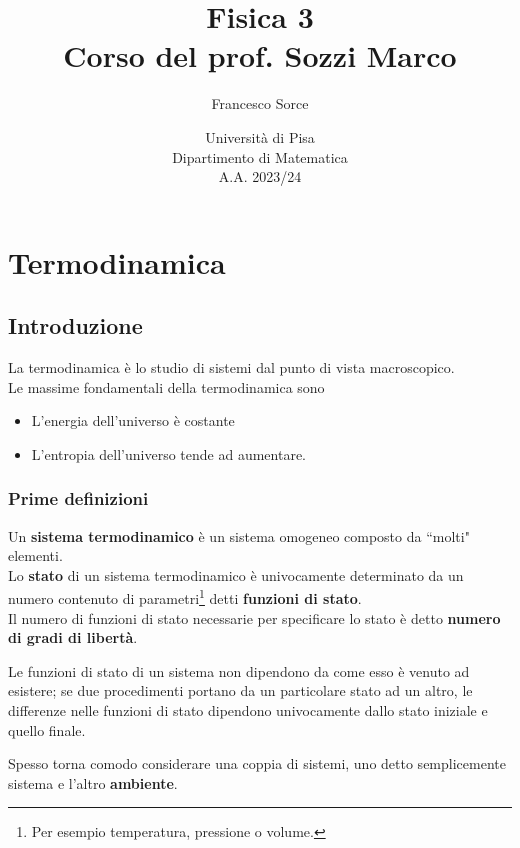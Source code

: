 \documentclass[a4paper]{report}
\title{Fisica 3\\
\large Corso del prof. Sozzi Marco}
\author{Francesco Sorce}
\date{Università di Pisa\\
Dipartimento di Matematica\\
A.A. 2023/24}
\begin{document}
\maketitle

\tableofcontents
\newpage


\part{Termodinamica}
\chapter{Introduzione}
\noindent
La termodinamica \`e lo studio di sistemi dal punto di vista macroscopico.\\
Le massime fondamentali della termodinamica sono
\begin{itemize}
\item L'energia dell'universo \`e costante
\item L'entropia dell'universo tende ad aumentare.
\end{itemize}

\section{Prime definizioni}
\begin{definition}
Un \textbf{sistema termodinamico} \`e un sistema omogeneo composto da ``molti" elementi.\\
Lo \textbf{stato} di un sistema termodinamico \`e univocamente determinato da un numero contenuto di parametri\footnote{Per esempio temperatura, pressione o volume.} detti \textbf{funzioni di stato}.\\
Il numero di funzioni di stato necessarie per specificare lo stato \`e detto \textbf{numero di gradi di libert\`a}.
\end{definition}

\begin{remark}
Le funzioni di stato di un sistema non dipendono da come esso \`e venuto ad esistere; se due procedimenti portano da un particolare stato ad un altro, le differenze nelle funzioni di stato dipendono univocamente dallo stato iniziale e quello finale.
\end{remark}

\begin{remark}
Spesso torna comodo considerare una coppia di sistemi, uno detto semplicemente sistema e l'altro \textbf{ambiente}.
\end{remark}
\end{document}
